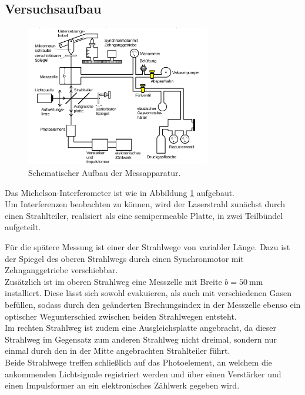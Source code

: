 \subsection{Versuchsaufbau}
\label{sec:Versuchsaufbau}
\begin{figure}
	\centering
	\includegraphics[width=0.72\textwidth]{Bilder/aufbau.png}
	\caption{Schematischer Aufbau der Messapparatur. \cite{Anleitung}}
  \label{fig:aufbau}
\end{figure}
Das Michelson-Interferometer ist wie in Abbildung \ref{fig:aufbau} aufgebaut.\\
Um Interferenzen beobachten zu können, wird der Laserstrahl zunächst durch einen Strahlteiler, realisiert als eine semipermeable Platte, in zwei Teilbündel aufgeteilt.

Für die spätere Messung ist einer der Strahlwege von variabler Länge. Dazu ist der Spiegel
des oberen Strahlwegs durch einen Synchronmotor mit Zehnganggetriebe verschiebbar.
\\Zusätzlich ist im oberen Strahlweg eine Messzelle mit Breite $b=\SI{50}{\milli\meter}$ installiert.
Diese lässt sich sowohl evakuieren, als auch mit verschiedenen Gasen befüllen, sodass durch den geänderten Brechungsindex in der Messzelle ebenso ein optischer Wegunterschied zwischen beiden Strahlwegen entsteht. \\
Im rechten Strahlweg ist zudem eine Ausgleichsplatte angebracht, da dieser Strahlweg im Gegensatz zum anderen Strahlweg nicht dreimal, sondern nur einmal durch den in der Mitte angebrachten Strahlteiler führt.\\
Beide Strahlwege treffen schließlich auf das Photoelement, an welchem die ankommenden Lichtsignale registriert werden und über einen Verstärker und einen Impulsformer an ein elektronisches Zählwerk gegeben wird.
